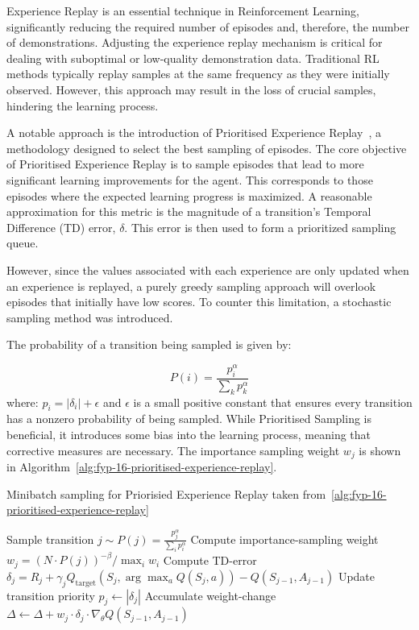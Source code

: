 
Experience Replay is an essential technique in Reinforcement Learning, significantly reducing the required number of episodes and, therefore, the number of demonstrations.
Adjusting the experience replay mechanism is critical for dealing with suboptimal or low-quality demonstration data.
Traditional RL methods typically replay samples at the same frequency as they were initially observed.
However, this approach may result in the loss of crucial samples, hindering the learning process.

A notable approach is the introduction of Prioritised Experience Replay~\cite{fyp-16-prioritised-experience-replay}, a methodology designed to select the best sampling of episodes. 
The core objective of Prioritised Experience Replay is to sample episodes that lead to more significant learning improvements for the agent. 
This corresponds to those episodes where the expected learning progress is maximized. 
A reasonable approximation for this metric is the magnitude of a transition's Temporal Difference (TD) error, $\delta$. 
This error is then used to form a prioritized sampling queue.

However, since the values associated with each experience are only updated when an experience is replayed, a purely greedy sampling approach will overlook episodes that initially have low scores.
To counter this limitation, a stochastic sampling method was introduced.

The probability of a transition being sampled is given by:

\[ P(i) = \frac{p_{i}^{\alpha}}{\sum_{k} p_{k}^{\alpha}} \]
where: $p_{i} = |\delta_{i}| + \epsilon$ and $\epsilon$ is a small positive constant that ensures every transition has a nonzero probability of being sampled.
While Prioritised Sampling is beneficial, it introduces some bias into the learning process, meaning that corrective measures are necessary. 
The importance sampling weight $w_j$ is shown in Algorithm~\ref{alg:fyp-16-prioritised-experience-replay}.

\begin{algorithm}
  \caption{Minibatch sampling for Priorisied Experience Replay taken from~\ref{alg:fyp-16-prioritised-experience-replay}}
  \label{alg:fyp-16-prioritised-experience-replay}
  \begin{algorithmic}[1]
      \State Sample transition $j \sim P(j) = \frac{p^{\alpha}_j}{\sum_i p^{\alpha}_i}$
      \State Compute importance-sampling weight $w_j = \left( N \cdot P(j) \right)^{-\beta} / \max_i w_i$
      \State Compute TD-error $\delta_j = R_j + \gamma_j Q_{\text{target}} \left( S_j, \arg\max_a Q(S_j, a) \right) - Q(S_{j-1}, A_{j-1})$
      \State Update transition priority $p_j \leftarrow |\delta_j|$
      \State Accumulate weight-change $\Delta \leftarrow \Delta + w_j \cdot \delta_j \cdot \nabla_{\theta}Q(S_{j-1}, A_{j-1})$
  \EndFor
  \end{algorithmic}
  \end{algorithm}  
  

